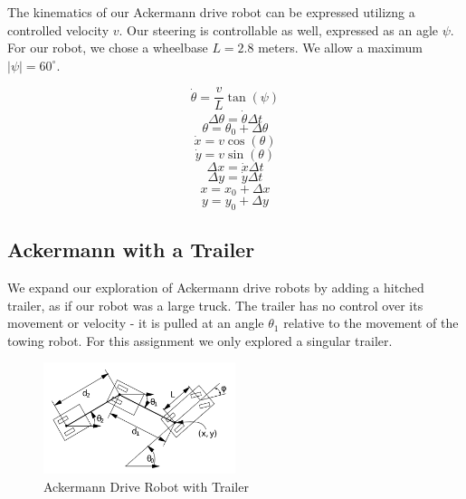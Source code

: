 \documentclass{article}
\begin{document}
The kinematics of our Ackermann drive robot can be expressed utilizng a controlled velocity $v$. Our steering is controllable as well, expressed as an agle $\psi$. For our robot, we chose a wheelbase $L=2.8$ meters. We allow a maximum $\lvert \psi \rvert = 60^\circ$.

\begin{equation}
    \dot{\theta} = \frac{v}{L} \tan(\psi)
\end{equation}
\begin{equation}
    \Delta \theta = \dot{\theta} \Delta t
\end{equation}
\begin{equation}
    \theta = \theta_0 + \Delta \theta
\end{equation}
\begin{equation}
    \dot{x} = v \cos(\theta)
\end{equation}
\begin{equation}
    \dot{y} = v \sin(\theta)
\end{equation}
\begin{equation}
    \Delta x = \dot{x} \Delta t
\end{equation}
\begin{equation}
    \Delta y = \dot{y} \Delta t
\end{equation}
\begin{equation}
    x = x_0 + \Delta x
\end{equation}
\begin{equation}
    y = y_0 + \Delta y
\end{equation}

\subsection*{Ackermann with a Trailer}

We expand our exploration of Ackermann drive robots by adding a hitched trailer, as if our robot was a large truck. The trailer has no control over its movement or velocity - it is pulled at an angle $\theta_1$ relative to the movement of the towing robot. For this assignment we only explored a singular trailer.

\begin{figure}[H]
    \centering
    \includegraphics[width = 0.5\textwidth]{imgs/ackermann_trailer.png}
    \caption{Ackermann Drive Robot with Trailer}
    \label{fig:ackermann-drive-trailer}
\end{figure}
\end{document}
